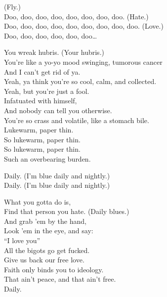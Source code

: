 (Fly.) \\
Doo, doo, doo, doo, doo, doo, doo, doo. (Hate.) \\
Doo, doo, doo, doo, doo, doo, doo, doo, doo. (Love.) \\
Doo, doo, doo, doo, doo, doo… \\


You wreak hubris. (Your hubris.) \\
You're like a yo-yo mood swinging, tumorous cancer \\
And I can't get rid of ya. \\
Yeah, ya think you're so cool, calm, and collected. \\
Yeah, but you're just a fool. \\

Infatuated with himself, \\
And nobody can tell you otherwise. \\
You're so crass and volatile, like a stomach bile. \\
Lukewarm, paper thin. \\
So lukewarm, paper thin. \\
So lukewarm, paper thin. \\
Such an overbearing burden. \\


Daily. (I'm blue daily and nightly.) \\
Daily. (I'm blue daily and nightly.) \\


What you gotta do is, \\
Find that person you hate. (Daily blues.) \\
And grab 'em by the hand, \\
Look 'em in the eye, and say: \\
``I love you'' \\

All the bigots go get fucked. \\
Give us back our free love. \\
Faith only binds you to ideology. \\
That ain't peace, and that ain't free. \\
Daily. \\


